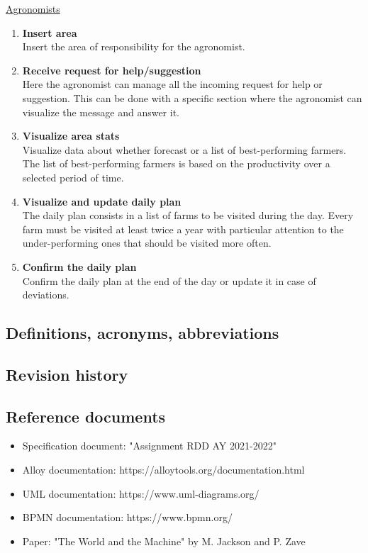 \documentclass[table, 12pt]{article}
\begin{document}
\underline{Agronomists}
\begin{enumerate}
    \item \textbf{Insert area}\\
    Insert the area of responsibility for the agronomist.
    \item \textbf{Receive request for help/suggestion}\\
    Here the agronomist can manage all the incoming request for help or suggestion.
    This can be done with a specific section where the agronomist can visualize the message and answer it.
    \item \textbf{Visualize area stats}\\
    Visualize data about whether forecast or a list of best-performing farmers.
    The list of best-performing farmers is based on the productivity over a selected period of time.
    \item \textbf{Visualize and update daily plan}\\
    The daily plan consists in a list of farms to be visited during the day.
    Every farm must be visited at least twice a year with particular attention to the under-performing ones that 
    should be visited more often.
    \item \textbf{Confirm the daily plan}\\
    Confirm the daily plan at the end of the day or update it in case of deviations.
\end{enumerate}
\subsection{Definitions, acronyms, abbreviations}
\subsection{Revision history}
\subsection{Reference documents}
\begin{itemize}
    \item Specification document: "Assignment RDD AY 2021-2022"
    \item Alloy documentation: https://alloytools.org/documentation.html
    \item UML documentation: https://www.uml-diagrams.org/
    \item BPMN documentation: https://www.bpmn.org/
    \item Paper: "The World and the Machine" by M. Jackson and P. Zave
\end{itemize}
\end{document}
